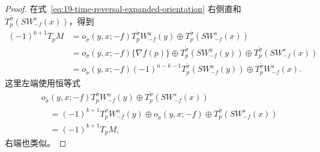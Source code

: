 \begin{proof}
在式~\eqref{eq:19-time-reversal-expanded-orientation} 右侧直和
$T_p^{\widetilde\sigma}(S W_{-f}^s(x))$，得到
\[
\begin{aligned}
 (-1)^{k+1}T_pM
 &=o_{\widetilde\sigma}(y,x;-f)
 T_p^{\widetilde\sigma}W_{-f}^u(y)
 \oplus T_p^{\widetilde\sigma}(S W_{-f}^s(x))\\
 &=o_{\widetilde\sigma}(y,x;-f)
 \{\nabla f(p)\}\oplus T_p^{\widetilde\sigma}(S W_{-f}^u(y))
 \oplus T_p^{\widetilde\sigma}(S W_{-f}^s(x))\\
 &=o_{\widetilde\sigma}(y,x;-f)(-1)^{n-k-1}
 T_p^{\widetilde\sigma}(S W_{-f}^u(y))
 \oplus T_p^{\widetilde\sigma}W_{-f}^s(x).
\end{aligned}
\]
这里左端使用恒等式
\[
\begin{aligned}
 &o_{\widetilde\sigma}(y,x;-f)
 T_p^{\widetilde\sigma}W_{-f}^u(y)
 \oplus T_p^{\widetilde\sigma}(S W_{-f}^s(x))\\
 &\quad=(-1)^{k+1}T_p^{\widetilde\sigma}W_{-f}^u(y)
 \oplus o_{\widetilde\sigma}(y,x;-f)
 \oplus T_p^{\widetilde\sigma}(S W_{-f}^s(x))\\
 &\quad=(-1)^{k+1}T_pM,
\end{aligned}
\]
右端也类似。


\end{proof}
